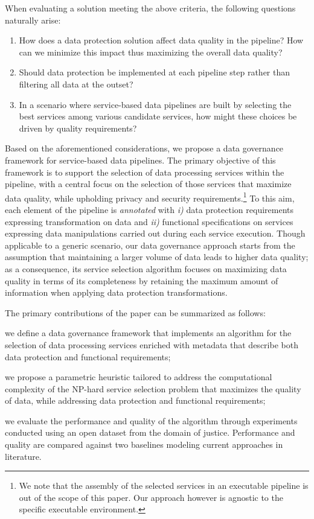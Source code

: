 When evaluating a solution meeting the above criteria, the following questions naturally arise:
\begin{enumerate}
\item {\color{OurColor}How does a data protection solution affect data quality in the pipeline? How can we minimize this impact thus maximizing the overall data quality?}
\item Should data protection be implemented at each pipeline step rather than filtering all data at the outset?
\item {\color{OurColor}In a scenario where service-based data pipelines are built by selecting the best services among various candidate services, how might these choices be driven by quality requirements?}
\end{enumerate}

Based on the aforementioned considerations, we propose a data governance framework for {\color{OurColor}service-based data pipelines}. %
The primary objective of this framework is to support the selection of data processing services within the pipeline, with a central focus on the selection of those services that {\color{OurColor}maximize} data quality, while upholding privacy and security requirements.\footnote{{\color{OurColor}We note that the assembly of the selected services in an executable pipeline is out of the scope of this paper. Our approach however is agnostic to the specific executable environment.}}
To this aim, each element of the pipeline is \textit{annotated} with \emph{i)} data protection requirements expressing transformation on data and \emph{ii)} functional specifications on services expressing data manipulations carried out during each service execution.
Though applicable to a generic scenario, our data governance approach starts from the assumption that maintaining a larger volume of data leads to higher data quality; as a consequence, its service selection algorithm focuses on maximizing data quality {\color{OurColor}in terms of its completeness} by retaining the maximum amount of information when applying data protection transformations.

The primary contributions of the paper can be summarized as follows:
\begin{enumerate*}
  \item we define a data governance framework {\color{OurColor}that implements an algorithm for the selection of data processing services} enriched with metadata that describe both data protection and functional requirements;
  \item we propose a parametric heuristic tailored to address the computational complexity of the NP-hard service selection problem {\color{OurColor}that maximizes the quality of data, while addressing data protection and functional requirements};
  \item we evaluate the performance and quality of the algorithm through experiments conducted using {\color{OurColor}an open dataset from the domain of justice. Performance and quality are compared against two baselines modeling current approaches in literature.}
\end{enumerate*}


